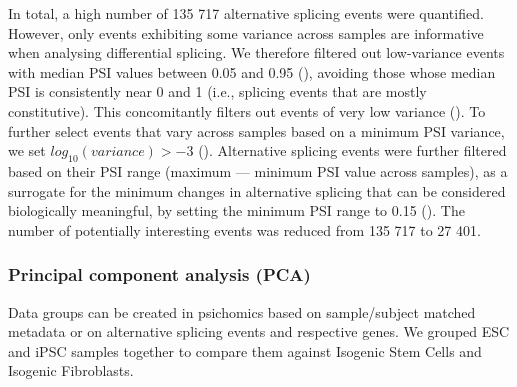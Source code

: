 In total, a high number of 135 717 alternative splicing events were quantified. However, only events exhibiting some variance across samples are informative when analysing differential splicing. We therefore filtered out low-variance events with median PSI values between 0.05 and 0.95 (), avoiding those whose median PSI is consistently near 0 and 1 (i.e., splicing events that are mostly constitutive). This concomitantly filters out events of very low variance (). To further select events that vary across samples based on a minimum PSI variance, we set $log_{10}(variance) > -3$ (). Alternative splicing events were further filtered based on their PSI range (maximum — minimum PSI value across samples), as a surrogate for the minimum changes in alternative splicing that can be considered biologically meaningful, by setting the minimum PSI range to 0.15 (). The number of potentially interesting events was reduced from 135 717 to 27 401.


\subsubsection{Principal component analysis (PCA)}

Data groups can be created in psichomics based on sample/subject matched metadata or on alternative splicing events and respective genes. We grouped ESC and iPSC samples together to compare them against Isogenic Stem Cells and Isogenic Fibroblasts.



